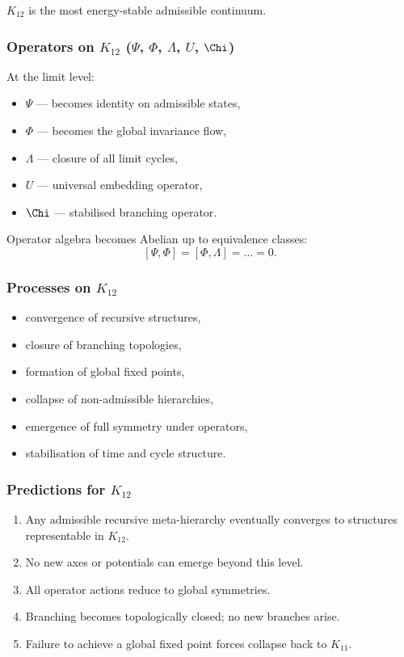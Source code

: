 $K_{12}$ is the most energy-stable admissible continuum.

\subsubsection{Operators on $K_{12}$ ($\Psi$, $\Phi$, $\Lambda$, $U$, $\Chi$)}

At the limit level:

\begin{itemize}
    \item $\Psi$ — becomes identity on admissible states,
    \item $\Phi$ — becomes the global invariance flow,
    \item $\Lambda$ — closure of all limit cycles,
    \item $U$ — universal embedding operator,
    \item $\Chi$ — stabilised branching operator.
\end{itemize}

Operator algebra becomes Abelian up to equivalence classes:
\[
[\Psi,\Phi]=[\Phi,\Lambda]=\dots = 0.
\]

\subsubsection{Processes on $K_{12}$}

\begin{itemize}
    \item convergence of recursive structures,
    \item closure of branching topologies,
    \item formation of global fixed points,
    \item collapse of non-admissible hierarchies,
    \item emergence of full symmetry under operators,
    \item stabilisation of time and cycle structure.
\end{itemize}

\subsubsection{Predictions for $K_{12}$}

\begin{enumerate}
    \item Any admissible recursive meta-hierarchy eventually converges to
          structures representable in $K_{12}$.
    \item No new axes or potentials can emerge beyond this level.
    \item All operator actions reduce to global symmetries.
    \item Branching becomes topologically closed; no new branches arise.
    \item Failure to achieve a global fixed point forces collapse back to $K_{11}$.
\end{enumerate}

